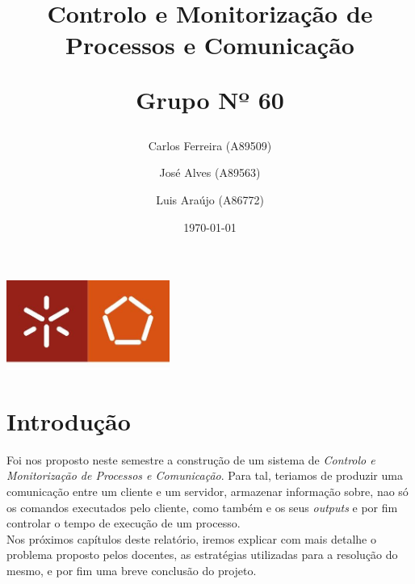 \documentclass[a4paper]{report}
\begin{document}
\title{\textbf {Controlo e Monitorização de Processos e Comunicação}\par\vspace{1cm}
\large Grupo Nº 60}
\author{Carlos Ferreira (A89509) \and José Alves (A89563) \and Luis Araújo (A86772)\vspace{3.5cm}}
\date{\today}

\begin{center}
    \begin{minipage}{0.9\linewidth}
        \centering
        \includegraphics[width=0.4\textwidth]{eng.jpeg}\par\vspace{1cm}
        \vspace{1.5cm}
        \href{https://www.uminho.pt/PT}
        {\color{black}{\scshape\LARGE Universidade do Minho}} \par
        \vspace{1cm}
        \href{https://www.di.uminho.pt/}
        {\color{black}{\scshape\Large Departamento de Informática}} \par
        \vspace{1.5cm}
        \maketitle
    \end{minipage}
\end{center}

\tableofcontents

\pagebreak

\chapter{Introdução}\label{chap:Introdução}
Foi nos proposto neste semestre a construção de um sistema de \textit{Controlo e Monitorização de Processos e Comunicação}. Para tal, teriamos de produzir uma comunicação entre um cliente e um servidor, armazenar informação sobre, nao só os comandos executados pelo cliente, como também e os seus \textit{outputs} e por fim controlar o tempo de execução de um processo.\\
Nos próximos capítulos deste relatório, iremos explicar com mais detalhe o problema proposto pelos docentes, as estratégias utilizadas para a resolução do mesmo, e por fim uma breve conclusão do projeto. 
\end{document}
